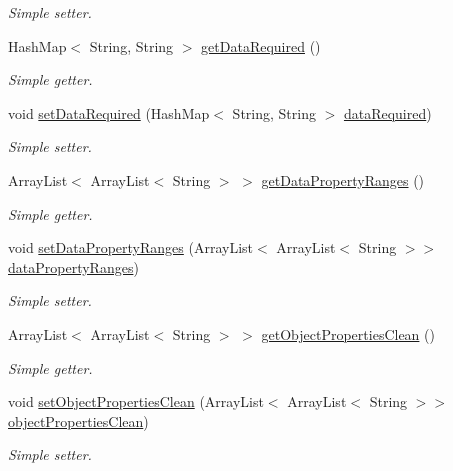 \begin{DoxyCompactItemize}
\begin{DoxyCompactList}\small\item\em Simple setter. \end{DoxyCompactList}\item 
HashMap$<$ String, String $>$ \hyperlink{class_data_base_1_1_tables_a4d7111a9066de5419b44d10619e5fc65}{getDataRequired} ()
\begin{DoxyCompactList}\small\item\em Simple getter. \end{DoxyCompactList}\item 
void \hyperlink{class_data_base_1_1_tables_acc961989faf4e25f8391d92b5ea8d620}{setDataRequired} (HashMap$<$ String, String $>$ \hyperlink{class_data_base_1_1_tables_af968a71b80946ad236d287dad7a68774}{dataRequired})
\begin{DoxyCompactList}\small\item\em Simple setter. \end{DoxyCompactList}\item 
ArrayList$<$ ArrayList$<$ String $>$ $>$ \hyperlink{class_data_base_1_1_tables_a6fd83e3450cb0ec3a16db078b1c3f5a3}{getDataPropertyRanges} ()
\begin{DoxyCompactList}\small\item\em Simple getter. \end{DoxyCompactList}\item 
void \hyperlink{class_data_base_1_1_tables_a2966ba30db9ec5fa6be2d84a25a6d150}{setDataPropertyRanges} (ArrayList$<$ ArrayList$<$ String $>$$>$ \hyperlink{class_data_base_1_1_tables_ac4fac81e62e9331f412a2ede3ddcc502}{dataPropertyRanges})
\begin{DoxyCompactList}\small\item\em Simple setter. \end{DoxyCompactList}\item 
ArrayList$<$ ArrayList$<$ String $>$ $>$ \hyperlink{class_data_base_1_1_tables_a8672a5216105a348c0719724ec56fdba}{getObjectPropertiesClean} ()
\begin{DoxyCompactList}\small\item\em Simple getter. \end{DoxyCompactList}\item 
void \hyperlink{class_data_base_1_1_tables_adcdf3af4edd0f1edae29d53baf10cd67}{setObjectPropertiesClean} (ArrayList$<$ ArrayList$<$ String $>$$>$ \hyperlink{class_data_base_1_1_tables_aefcb4c8a578671a32a64c3196281f479}{objectPropertiesClean})
\begin{DoxyCompactList}\small\item\em Simple setter. \end{DoxyCompactList}\item 

\end{DoxyCompactItemize}
